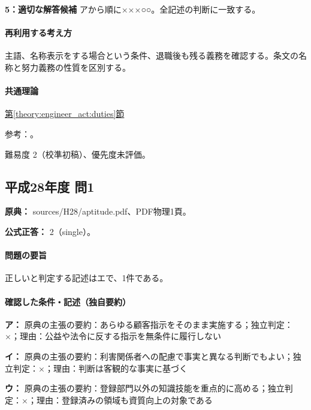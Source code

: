 \noindent\textbf{5：適切な解答候補} アから順に×××○○。全記述の判断に一致する。\par

\paragraph{再利用する考え方} 主語、名称表示をする場合という条件、退職後も残る義務を確認する。条文の名称と努力義務の性質を区別する。

\paragraph{共通理論} \hyperref[theory:engineer_act:duties]{第\ref*{theory:engineer_act:duties}節}

\par 参考：\cite{engineer_act_current}。

\par 難易度 2（校準初稿）、優先度未評価。

\subsection{平成28年度 問1}
\label{q:h28-reg-apt-01}

\noindent\textbf{原典：} sources/H28/aptitude.pdf、PDF物理1頁。

\textbf{公式正答：} 2（single）。

\paragraph{問題の要旨} 正しいと判定する記述はエで、1件である。

\paragraph{確認した条件・記述（独自要約）}\mbox{}\par

\noindent\textbf{ア：} 原典の主張の要約：あらゆる顧客指示をそのまま実施する；独立判定：×；理由：公益や法令に反する指示を無条件に履行しない\par

\noindent\textbf{イ：} 原典の主張の要約：利害関係者への配慮で事実と異なる判断でもよい；独立判定：×；理由：判断は客観的な事実に基づく\par

\noindent\textbf{ウ：} 原典の主張の要約：登録部門以外の知識技能を重点的に高める；独立判定：×；理由：登録済みの領域も資質向上の対象である\par

